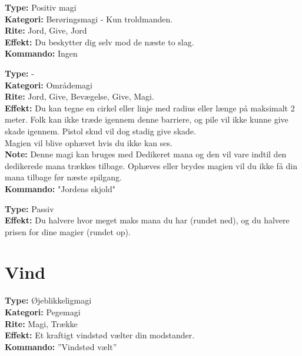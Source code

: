 \begin{jord*}[Jordensrustning]
\textbf{Type:} Positiv magi\\
\textbf{Kategori:} Berøringsmagi - Kun troldmanden.\\
\textbf{Rite:} Jord, Give, Jord\\
\textbf{Effekt:} Du beskytter dig selv mod de næste to slag.\\
\textbf{Kommando:} Ingen
\end{jord*}

\begin{jord*}
\textbf{Type:} -\\
\textbf{Kategori:} Områdemagi \\
\textbf{Rite:} Jord, Give, Bevægelse, Give, Magi.\\
\textbf{Effekt:} Du kan tegne en cirkel eller linje med radius eller længe på maksimalt 2 meter. Folk kan ikke træde igennem denne barriere, og pile vil ikke kunne give skade igennem. Pistol skud vil dog stadig give skade.\\
Magien vil blive ophævet hvis du ikke kan ses.\\
\textbf{Note:} Denne magi kan bruges med Dedikeret mana og den vil vare indtil den dedikerede mana trækkes tilbage. Ophæves eller brydes magien vil du ikke få din mana tilbage før næste spilgang.\\
\textbf{Kommando:} "Jordens skjold"
\end{jord*}

\begin{jord*}
\textbf{Type:} Passiv\\
\textbf{Effekt:} Du halvere hvor meget maks mana du har (rundet ned), og du halvere prisen for dine magier (rundet op).
\end{jord*}

\section{Vind}
\begin{vind*}[Vindstød]
\textbf{Type:} Øjeblikkeligmagi\\
\textbf{Kategori:} Pegemagi\\
\textbf{Rite:} Magi, Trække\\
\textbf{Effekt:} Et kraftigt vindstød vælter din modstander.\\ 
\textbf{Kommando:} ”Vindstød vælt”\\
\end{vind*}

